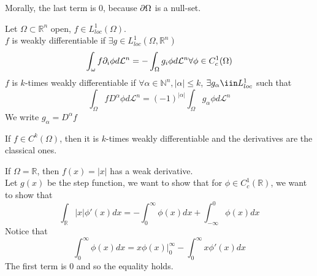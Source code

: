 \documentclass[../main.tex]{subfiles}
\begin{document}
Morally, the last term is 0, because $\partial \Omega$ is a null-set.
\begin{defn}
	Let $\Omega \subset \mathbb{R}^n$ open, $f \in L^{1}_{loc} ( \Omega) $.\\
	$f$ is weakly differentiable if $\exists g \in L^{1}_{loc} ( \Omega, \mathbb{R}^n) $ 
	\[ 
	\int_\omega f \partial_i \phi d \mathcal{L}^{n}= - \int_{ \Omega }^{  }g_i \phi d \mathcal{L}^{n}\forall \phi \in C^{1}_c( \Omega) 
	\]
$f$ is $k$-times weakly differentiable if $\forall \alpha\in \mathbb{N}^{n}, |\alpha| \leq k$, $\exists g_\alpha \iin L^{1}_{loc} $ such that
\[ 
\int_{ \Omega }^{  } f D^{\alpha}\phi d \mathcal{L}^{n}= ( -1)^{|\alpha|} \int_{ \Omega }^{  }g_\alpha \phi d \mathcal{L}^{n}
\]
We write $g_\alpha = D^{\alpha} f$ 

\end{defn}
\begin{rmq}
If $f\in C^{k}( \Omega) $, then it is $k$-times weakly differentiable and the derivatives are the classical ones.
\end{rmq}
\begin{exemple}
If $\Omega= \mathbb{R}$, then $f( x) = |x|$ has a weak derivative.\\
Let $g( x) $ be the step function, we want to show that for $\phi \in C^{1}_c ( \mathbb{R}) $, we want to show that
\[ 
\int_{ \mathbb{R} }^{  } |x| \phi'( x) dx = - \int_{ 0 }^{  \infty  } \phi( x) dx + \int_{ - \infty  }^{0  } \phi( x) dx
\]
Notice that 
\[ 
\int_{ 0 }^{ \infty  }\phi( x) dx = x\phi( x) |_0^{ \infty }- \int_{ 0 }^{  \infty  } x\phi'( x) dx
\]
The first term is 0 and so the equality holds.

\end{exemple}
\end{document}
